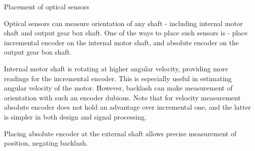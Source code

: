 \documentclass{beamer}
\begin{document}
\begin{frame}{Placement of optical sensors}
	\begin{flushleft}
		
		Optical sensors can measure orientation of any shaft - including internal motor shaft and output gear box shaft. One of the ways to place such sensors is - place incremental encoder on the internal motor shaft, and absolute encoder on the output gear box shaft.
		
		\bigskip
		
		Internal motor shaft is rotating at higher angular velocity, providing more readings for the incremental encoder. This is especially useful in estimating angular velocity of the motor. However, backlash can make measurement of orientation with such an encoder dubious. Note that for velocity measurement absolute encoder does not hold an advantage over incremental one, and the latter is simpler in both design and signal processing.
		
		\bigskip
		
		Placing absolute encoder at the external shaft allows precise measurement of position, negating backlash. 
		
	\end{flushleft}
\end{frame}


\myqrframe
\end{document}
